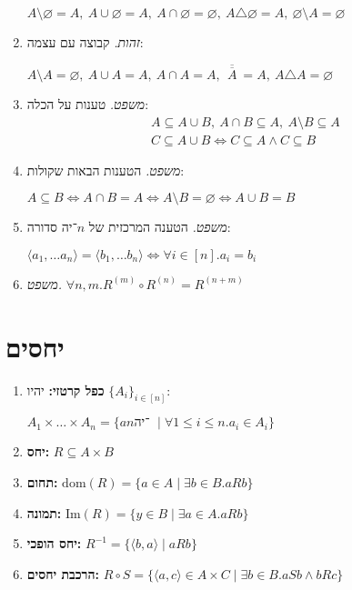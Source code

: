 \documentclass[]{article}
\newcommand\ra    {\rangle}
\newcommand\la    {\langle}
\newcommand\dom   {\mathrm{dom}}
\newcommand\Img   {\mathrm{Im}}
\newcommand\trio  {\triangle}
\newcommand\n     {$n$־יה\ }
\newcommand\ol    {\overline}
\newcommand\op    {^{-1}}
\newcommand\tho       {\textit{משפט. }}
\newcommand\id        {\textit{זהות. }}
\begin{document}
\begin{multicols}{2}
\begin{enumerate}
				\hfill$ A \setminus \varnothing = A, \ A \cup \varnothing = A, \ A \cap \varnothing = \varnothing, \ A \trio \varnothing = A, \ \varnothing \setminus A = \varnothing $
			\item \id קבוצה עם עצמה: 
				
				\hfill$  A \setminus A = \varnothing, \ A \cup A = A, \ A \cap A = A, \ \ol{\ \ol A \ } = A, \ A \trio A = \varnothing $
			\item \tho טענות על הכלה: 
			\begin{gather*}
				A \subseteq A \cup B, \ A \cap B \subseteq A, \ A \setminus B \subseteq A \\
				C \subseteq A \cup B \iff C \subseteq A \land C \subseteq B
			\end{gather*}
			\item \tho הטענות הבאות שקולות: 
			
				\hfill $ A \subseteq B \iff A \cap B = A \iff A \setminus B = \varnothing \iff A \cup B = B $
			\item \tho הטענה המרכזית של $n$־יה סדורה: 
				
				\hfill$ \la a_1, \dots a_n \ra = \la b_1, \dots b_n \ra \iff \forall i \in [n]. a_i = b_i $
			\item \tho $\forall n, m. R^{(m)} \circ R^{(n)} = R^{(n + m)}$
		\end{enumerate}
			\section{יחסים}
		\begin{enumerate}[resume]
			\item \textbf{כפל קרטזי: }יהיו $\{A_i\}_{i \in [n]}$: 
				
				\hfill $ A_1 \times \dots \times A_n = \{a \text{\n} \mid \forall 1 \le i \le n. a_i \in A_i\} $
			\item \textbf{יחס: }\hfill $R \subseteq A \times B$
			\item \textbf{תחום: }\hfill$\dom(R) = \{a \in A \mid \exists b \in B. aRb\} $
			\item \textbf{תמונה: }\hfill$\Img(R) = \{y \in B \mid \exists a \in A. aRb\}$
			\item \textbf{יחס הופכי: }\hfill$R\op = \{\la b, a \ra \mid aRb\}$
			\item \textbf{הרכבת יחסים: }\hfill$R \circ S = \{\la a, c \ra \in A \times C \mid \exists b \in B. aSb \land bRc\}$
		\end{enumerate}

\end{multicols}
\end{document}

